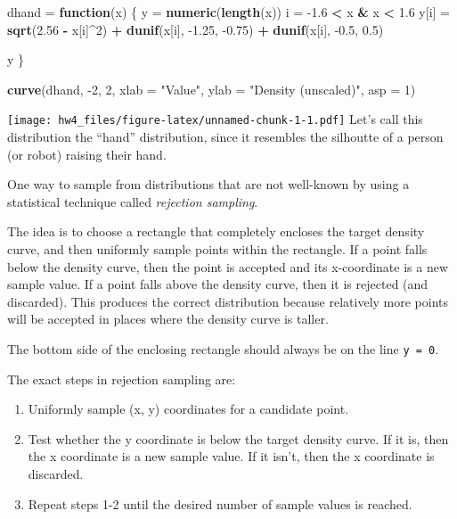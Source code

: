 \documentclass[
]{article}
\newenvironment{Shaded}{\begin{snugshade}}{\end{snugshade}}
\newcommand{\ControlFlowTok}[1]{\textcolor[rgb]{0.13,0.29,0.53}{\textbf{#1}}}
\newcommand{\DataTypeTok}[1]{\textcolor[rgb]{0.13,0.29,0.53}{#1}}
\newcommand{\DecValTok}[1]{\textcolor[rgb]{0.00,0.00,0.81}{#1}}
\newcommand{\FloatTok}[1]{\textcolor[rgb]{0.00,0.00,0.81}{#1}}
\newcommand{\KeywordTok}[1]{\textcolor[rgb]{0.13,0.29,0.53}{\textbf{#1}}}
\newcommand{\NormalTok}[1]{#1}
\newcommand{\OperatorTok}[1]{\textcolor[rgb]{0.81,0.36,0.00}{\textbf{#1}}}
\newcommand{\StringTok}[1]{\textcolor[rgb]{0.31,0.60,0.02}{#1}}
\providecommand{\tightlist}{%
  \setlength{\itemsep}{0pt}\setlength{\parskip}{0pt}}
\begin{document}
\begin{Shaded}
\begin{Highlighting}[]
\NormalTok{dhand =}\StringTok{ }\ControlFlowTok{function}\NormalTok{(x) \{}
\NormalTok{  y =}\StringTok{ }\KeywordTok{numeric}\NormalTok{(}\KeywordTok{length}\NormalTok{(x))}
\NormalTok{  i =}\StringTok{ }\FloatTok{{-}1.6} \OperatorTok{\textless{}}\StringTok{ }\NormalTok{x }\OperatorTok{\&}\StringTok{ }\NormalTok{x }\OperatorTok{\textless{}}\StringTok{ }\FloatTok{1.6}
\NormalTok{  y[i] =}\StringTok{ }\KeywordTok{sqrt}\NormalTok{(}\FloatTok{2.56} \OperatorTok{{-}}\StringTok{ }\NormalTok{x[i]}\OperatorTok{\^{}}\DecValTok{2}\NormalTok{) }\OperatorTok{+}\StringTok{ }\KeywordTok{dunif}\NormalTok{(x[i], }\FloatTok{{-}1.25}\NormalTok{, }\FloatTok{{-}0.75}\NormalTok{) }\OperatorTok{+}
\StringTok{    }\KeywordTok{dunif}\NormalTok{(x[i], }\FloatTok{{-}0.5}\NormalTok{, }\FloatTok{0.5}\NormalTok{)}

\NormalTok{  y}
\NormalTok{\}}

\KeywordTok{curve}\NormalTok{(dhand, }\DecValTok{{-}2}\NormalTok{, }\DecValTok{2}\NormalTok{, }\DataTypeTok{xlab =} \StringTok{"Value"}\NormalTok{, }\DataTypeTok{ylab =} \StringTok{"Density (unscaled)"}\NormalTok{, }\DataTypeTok{asp =} \DecValTok{1}\NormalTok{)}
\end{Highlighting}
\end{Shaded}

\texttt{[image: hw4\_files/figure-latex/unnamed-chunk-1-1.pdf]} Let's
call this distribution the ``hand'' distribution, since it resembles the
silhoutte of a person (or robot) raising their hand.

One way to sample from distributions that are not well-known by using a
statistical technique called \emph{rejection sampling}.

The idea is to choose a rectangle that completely encloses the target
density curve, and then uniformly sample points within the rectangle. If
a point falls below the density curve, then the point is accepted and
its x-coordinate is a new sample value. If a point falls above the
density curve, then it is rejected (and discarded). This produces the
correct distribution because relatively more points will be accepted in
places where the density curve is taller.

The bottom side of the enclosing rectangle should always be on the line
\texttt{y\ =\ 0}.

The exact steps in rejection sampling are:

\begin{enumerate}
\def\labelenumi{\arabic{enumi}.}
\tightlist
\item
  Uniformly sample (x, y) coordinates for a candidate point.
\item
  Test whether the y coordinate is below the target density curve. If it
  is, then the x coordinate is a new sample value. If it isn't, then the
  x coordinate is discarded.
\item
  Repeat steps 1-2 until the desired number of sample values is reached.
\end{enumerate}
\end{document}
